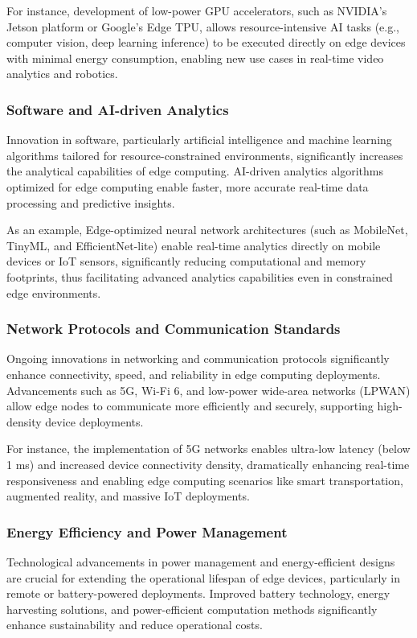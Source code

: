 \documentclass[runningheads]{llncs}
\begin{document}
\noindent For instance, development of low-power GPU accelerators, such as NVIDIA's Jetson platform or Google's Edge TPU, allows resource-intensive AI tasks (e.g., computer vision, deep learning inference) to be executed directly on edge devices with minimal energy consumption, enabling new use cases in real-time video analytics and robotics.

\subsubsection{Software and AI-driven Analytics}
Innovation in software, particularly artificial intelligence and machine learning algorithms tailored for resource-constrained environments, significantly increases the analytical capabilities of edge computing. AI-driven analytics algorithms optimized for edge computing enable faster, more accurate real-time data processing and predictive insights.

\noindent As an example, Edge-optimized neural network architectures (such as MobileNet, TinyML, and EfficientNet-lite) enable real-time analytics directly on mobile devices or IoT sensors, significantly reducing computational and memory footprints, thus facilitating advanced analytics capabilities even in constrained edge environments.

\subsubsection{Network Protocols and Communication Standards}
Ongoing innovations in networking and communication protocols significantly enhance connectivity, speed, and reliability in edge computing deployments. Advancements such as 5G, Wi-Fi 6, and low-power wide-area networks (LPWAN) allow edge nodes to communicate more efficiently and securely, supporting high-density device deployments.

\noindent For instance, the implementation of 5G networks enables ultra-low latency (below 1 ms) and increased device connectivity density, dramatically enhancing real-time responsiveness and enabling edge computing scenarios like smart transportation, augmented reality, and massive IoT deployments.

\subsubsection{Energy Efficiency and Power Management}
Technological advancements in power management and energy-efficient designs are crucial for extending the operational lifespan of edge devices, particularly in remote or battery-powered deployments. Improved battery technology, energy harvesting solutions, and power-efficient computation methods significantly enhance sustainability and reduce operational costs.
\end{document}
